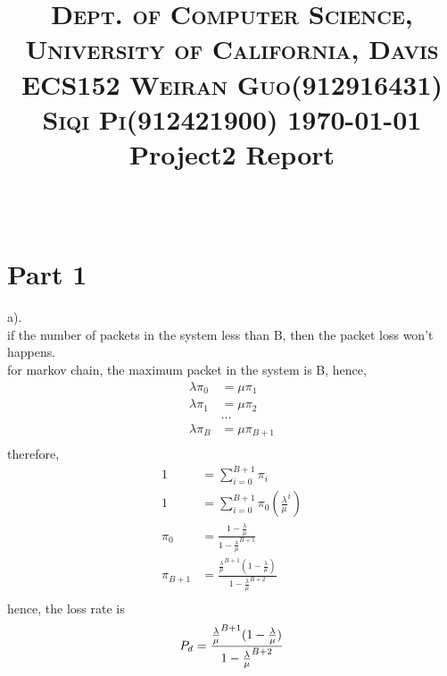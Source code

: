 \documentclass[paper=a4, fontsize=11pt]{scrartcl}
\title{	
\normalfont \normalsize 
\textsc{Dept. of Computer Science, University of California, Davis\\ECS152 \hspace{.5in}
Weiran Guo(912916431)  Siqi Pi(912421900) \hspace{.5in} \today}
\horrule{0.5pt} \\[0.4cm]
\huge Project2 Report \\
\horrule{2pt} \\[0.5cm]
}
\date{}
\DeclarePairedDelimiter\floor{\lfloor}{\rfloor}
\numberwithin{equation}{section} %
\numberwithin{figure}{section} %
\numberwithin{table}{section} %
\begin{document}
\maketitle

\vspace{-1in}


\section{Part 1}

       a).\\
       if the number of packets in the system less than B, %
       then the packet loss won't happens.\\
       
        for markov chain, the maximum packet in the system is B, hence,
        \begin{align}
            \lambda\pi_0 &= \mu\pi_1\\
            \lambda\pi_1 &= \mu\pi_2\\
                &...\\
            \lambda\pi_{B} &= \mu\pi_{B+1}\\
        \end{align}
        therefore,
        \begin{align}
            1 &= \sum_{i = 0}^{B+1} \pi_i\\
            1 &= \sum_{i = 0}^{B+1} \pi_0(\frac{\lambda}{\mu}^i)\\
            \pi_0 &= \frac{1-\frac{\lambda}{\mu}}{1-\frac{\lambda}{\mu}^{B+1}}\\
            \pi_{B+1} &= \frac{\frac{\lambda}{\mu}^{B+1}(1-\frac{\lambda}{\mu})}{1-\frac{\lambda}{\mu}^{B+2}}\\
        \end{align}
        hence, the loss rate is
        \begin{equation}
            P_d = \frac{\frac{\lambda}{\mu}^{B+1}(1-\frac{\lambda}{\mu})}{1-\frac{\lambda}{\mu}^{B+2}}\\
        \end{equation}
\end{document}
